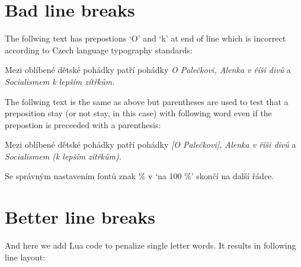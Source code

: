 \documentclass{article}
\newcommand{\expl}[1]{{\sffamily #1}}
\begin{document}
\section{Bad line breaks}

\expl{The follwing text has prepostions `O' and `k' at end of line which
  is incorrect according to Czech language typography standards:}

Mezi oblíbené dětské pohádky patří pohádky \emph{O Palečkovi, Alenka v říši
  divů} a \emph{Socialismem k lepším zítřkům.}

\expl{The follwing text is the same as above but parentheses are used to test
  that a preposition stay (or not stay, in this case) with following word
  even if the prepostion is preceeded with a parenthesis:}

Mezi oblíbené dětské pohádky patří pohádky \emph{[O Palečkovi], Alenka v říši
  divů} a \emph{Socialismem (k lepším zítřkům).}

Se správným nastavením fontů znak \% v `na 100 \%' skončí na další řádce.

\section{Better line breaks}

\expl{And here we add Lua code to penalize single letter words. It results in
following line layout:}
\end{document}
